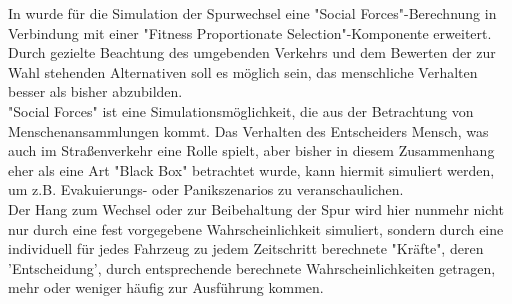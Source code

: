 In \cite{dat-ba} wurde für die Simulation der Spurwechsel eine "Social Forces"-Berechnung in Verbindung mit einer "Fitness Proportionate Selection"-Komponente erweitert. Durch gezielte Beachtung des umgebenden Verkehrs und dem Bewerten der zur Wahl stehenden Alternativen soll es möglich sein, das menschliche Verhalten besser als bisher abzubilden. \\
"Social Forces" ist eine Simulationsmöglichkeit, die aus der Betrachtung von Menschenansammlungen kommt. Das Verhalten des Entscheiders Mensch, was auch im Straßenverkehr eine Rolle spielt, aber bisher in diesem Zusammenhang eher als eine Art "Black Box" betrachtet wurde, kann hiermit simuliert werden, um z.B. Evakuierungs- oder Panikszenarios zu veranschaulichen.\\
Der Hang zum Wechsel oder zur Beibehaltung der Spur wird hier nunmehr nicht nur durch eine fest vorgegebene Wahrscheinlichkeit simuliert, sondern durch eine individuell für jedes Fahrzeug zu jedem Zeitschritt berechnete "Kräfte", deren 'Entscheidung', durch entsprechende berechnete Wahrscheinlichkeiten getragen, mehr oder weniger häufig zur Ausführung kommen. 